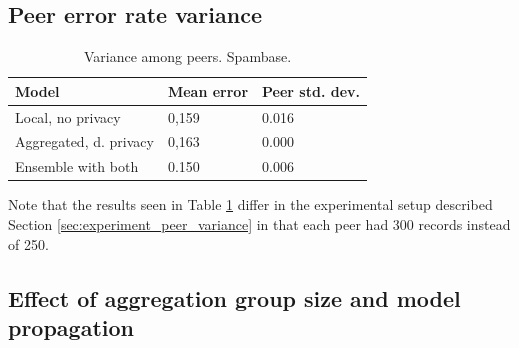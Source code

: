 \subsection{Peer error rate variance}

\begin{table}[H]
	\centering
	
	\begin{tabular}{|l|l|l|}
		\textbf{Model}                  & \textbf{Mean error} & \textbf{Peer std. dev.} \\
		\hline
		Local, no privacy      & 0,159 & 0.016 \\
		Aggregated, d. privacy & 0,163 & 0.000	 \\
		Ensemble with both & 0.150 & 0.006 \\
	\end{tabular}
	\caption{Variance among peers. Spambase.}
	\label{table:peer_variance_spam}
\end{table}

Note that the results seen in Table \ref{table:peer_variance_spam} differ in the experimental setup described Section \ref{sec:experiment_peer_variance} in that each peer had 300 records instead of 250.

\subsection{Effect of aggregation group size and model propagation}


